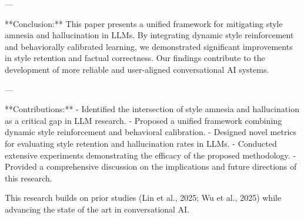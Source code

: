 ---

**Conclusion:**  
This paper presents a unified framework for mitigating style amnesia and hallucination in LLMs. By integrating dynamic style reinforcement and behaviorally calibrated learning, we demonstrated significant improvements in style retention and factual correctness. Our findings contribute to the development of more reliable and user-aligned conversational AI systems.

---

**Contributions:**  
- Identified the intersection of style amnesia and hallucination as a critical gap in LLM research.  
- Proposed a unified framework combining dynamic style reinforcement and behavioral calibration.  
- Designed novel metrics for evaluating style retention and hallucination rates in LLMs.  
- Conducted extensive experiments demonstrating the efficacy of the proposed methodology.  
- Provided a comprehensive discussion on the implications and future directions of this research.  

This research builds on prior studies (Lin et al., 2025; Wu et al., 2025) while advancing the state of the art in conversational AI.